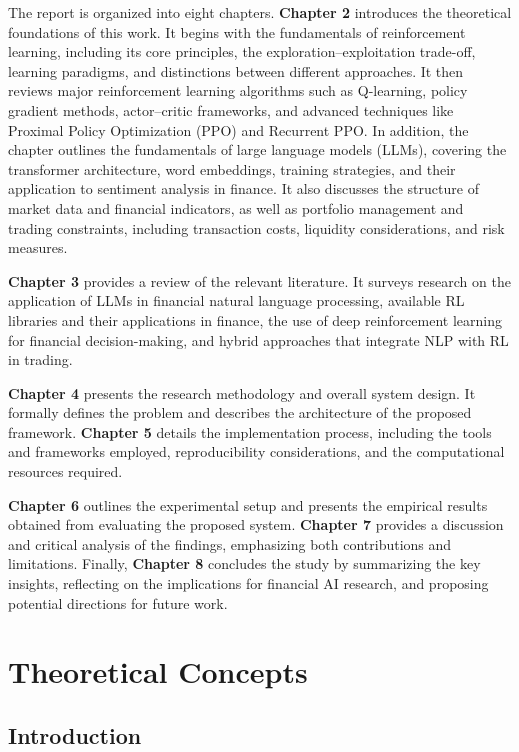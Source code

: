 \documentclass[12pt,a4paper]{report}
\begin{document}
The report is organized into eight chapters. \textbf{Chapter 2} introduces the theoretical foundations of this work. It begins with the fundamentals of reinforcement learning, including its core principles, the exploration--exploitation trade-off, learning paradigms, and distinctions between different approaches. It then reviews major reinforcement learning algorithms such as Q-learning, policy gradient methods, actor--critic frameworks, and advanced techniques like Proximal Policy Optimization (PPO) and Recurrent PPO. In addition, the chapter outlines the fundamentals of large language models (LLMs), covering the transformer architecture, word embeddings, training strategies, and their application to sentiment analysis in finance. It also discusses the structure of market data and financial indicators, as well as portfolio management and trading constraints, including transaction costs, liquidity considerations, and risk measures.  

\textbf{Chapter 3} provides a review of the relevant literature. It surveys research on the application of LLMs in financial natural language processing, available RL libraries and their applications in finance, the use of deep reinforcement learning for financial decision-making, and hybrid approaches that integrate NLP with RL in trading.  

\textbf{Chapter 4} presents the research methodology and overall system design. It formally defines the problem and describes the architecture of the proposed framework. \textbf{Chapter 5} details the implementation process, including the tools and frameworks employed, reproducibility considerations, and the computational resources required.  

\textbf{Chapter 6} outlines the experimental setup and presents the empirical results obtained from evaluating the proposed system. \textbf{Chapter 7} provides a discussion and critical analysis of the findings, emphasizing both contributions and limitations. Finally, \textbf{Chapter 8} concludes the study by summarizing the key insights, reflecting on the implications for financial AI research, and proposing potential directions for future work.  



\chapter{Theoretical Concepts}

\section{Introduction}
\end{document}
